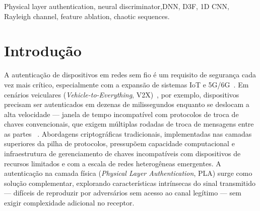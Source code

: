 \documentclass{sbrt}
\begin{document}
\begin{abstract}
This paper proposes the application of a neural network discriminator to the problem of physical layer authentication with chaotic authentication sequences (tags) over Rayleigh fading channels. We investigate three input representations for the discriminator's decision-making: (i) a four-feature physically motivated vector, (ii) a 1D CNN over the equalized received signal after legitimate tag extraction ($\mathbf{z}_{eq}$), and (iii) a DNN over $\mathbf{z}_{eq}$.
A systematic ablation study yields the central result: only two scalars per packet — the matched correlator output $|\tau|$ and the received energy $E$ — are necessary and sufficient to outperform the classical correlator, achieving $P_D = 87{,}2\%$ at 0~dB versus $8{,}1\%$ for the analytical method. In contrast, $\mathbf{z}_{eq}$-based approaches fail at low SNR because coherent integration cannot be performed without explicit access to the reference tag.

\end{abstract}
\begin{keywords}
Physical layer authentication, neural discriminator,DNN, D3F, 1D CNN, Rayleigh channel, feature ablation, chaotic sequences.
\end{keywords}

\section{Introdução}

A autenticação de dispositivos em redes sem fio é um requisito de segurança cada vez mais crítico, especialmente com a expansão de sistemas IoT e 5G/6G~\cite{ref_xie}. Em cenários veiculares (\textit{Vehicle-to-Everything}, V2X)~\cite{ref_3gpp}, por exemplo, dispositivos precisam ser autenticados em dezenas de milissegundos enquanto se deslocam a alta velocidade — janela de tempo incompatível com protocolos de troca de chaves convencionais, que exigem múltiplas rodadas de troca de mensagens entre as partes ~\cite{ref_raya}. Abordagens criptográficas tradicionais, implementadas nas camadas superiores da pilha de protocolos, pressupõem capacidade computacional e infraestrutura de gerenciamento de chaves incompatíveis com dispositivos de recursos limitados e com a escala de redes heterogêneas emergentes. A autenticação na camada física (\textit{Physical Layer Authentication}, PLA) surge como solução complementar, explorando características intrínsecas do sinal transmitido — difíceis de reproduzir por adversários sem acesso ao canal legítimo — sem exigir complexidade adicional no receptor.
\end{document}
